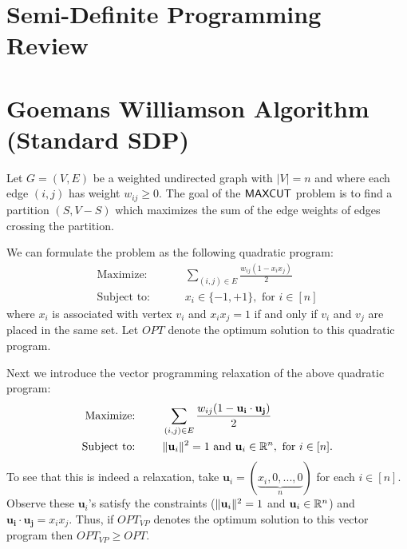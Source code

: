 \documentclass[
10pt, %
letterpaper, %
onecolumn, %
]{article}
\begin{document}
\pagestyle{myheadings} %
\markright{\doctitle} %


\thispagestyle{plain} %

\printtitle %

\section{Semi-Definite Programming Review}

\section{Goemans Williamson Algorithm (Standard SDP)}
Let $G = (V,E)$ be a weighted undirected graph with $|V| = n$ and where each edge $(i,j)$ has weight $w_{ij} \geq 0$. The goal of the $\mathsf{MAXCUT}$ problem is to find a partition $(S, V-S)$ which maximizes the sum of the edge weights of edges crossing the partition. 

We can formulate the problem as the following quadratic program:
\begin{align*}
\mbox{Maximize: }\qquad & \sum_{(i,j)\in E}\frac{w_{ij}(1-x_ix_j)}{2}\\
\mbox{Subject to: }\qquad & x_i\in \{-1, +1\}, \mbox{ for }i \in [n]
\end{align*}
where $x_i$ is associated with vertex $v_i$ and $x_ix_j = 1$ if and only if $v_i$ and $v_j$ are placed in the same set. Let $OPT$ denote the optimum solution to this quadratic program.

Next we introduce the vector programming relaxation of the above quadratic program:
\begin{align*}
\mbox{Maximize: }\qquad & \sum_{(i,j)\in E}\frac{w_{ij}(1-\mathbf{u_i} \cdot \mathbf{u_j})}{2}\\
\mbox{Subject to: }\qquad & \norm{\mathbf{u}_i}^2 = 1 \mbox{ and } \mathbf{u}_i \in \R^n, \mbox{ for }i \in [n].
\end{align*}
To see that this is indeed a relaxation, take $\mathbf{u}_i = (\underbrace{x_i, 0, ..., 0}_{n})$ for each $i \in [n]$. Observe these $\mathbf{u}_i$'s satisfy the constraints ($ \norm{\mathbf{u}_i}^2 = 1$ and $\mathbf{u}_i \in \mathbb{R}^n$) and $\mathbf{u_i} \cdot \mathbf{u_j} = x_ix_j$. Thus, if $OPT_{VP}$ denotes the optimum solution to this vector program then $OPT_{VP} \geq OPT$.
\end{document}
